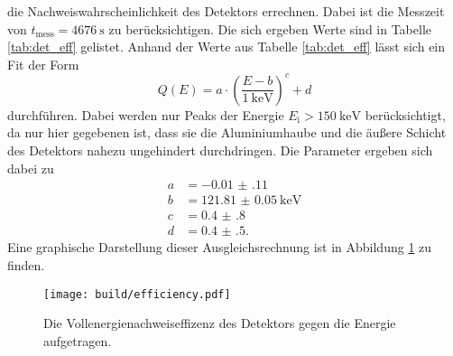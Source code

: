 die Nachweiswahrscheinlichkeit des Detektors errechnen. Dabei ist die Messzeit von $t_\text{mess} = \SI{4676}{\second}$
zu berücksichtigen. Die sich ergeben Werte sind in Tabelle \ref{tab:det_eff} gelistet.
Anhand der Werte aus Tabelle \ref{tab:det_eff} lässt sich ein Fit der Form
\begin{equation}
  Q(E) = a \cdot \left(\frac{E-b}{\SI{1}{\kilo\electronvolt}}\right)^c + d
\end{equation}
durchführen. Dabei werden nur Peaks der Energie $E_\text{i} > \SI{150}{\kilo\electronvolt}$ berücksichtigt,
da nur hier gegebenen ist, dass sie die Aluminiumhaube und die äußere Schicht des Detektors nahezu
ungehindert durchdringen. Die Parameter ergeben sich dabei zu
\begin{align*}
  a &= \num{-0.01(11)} \\
  b &= \SI{121.81(5)}{\kilo\electronvolt} \\
  c &= \num{0.4(8)} \\
  d &= \num{0.4(5)}.
\end{align*}
Eine graphische Darstellung dieser Ausgleichsrechnung ist in Abbildung \ref{fig:effizenz} zu finden.

\begin{figure}[htb]
 \centering
 \texttt{[image: build/efficiency.pdf]}
 \caption{Die Vollenergienachweiseffizenz des Detektors gegen die Energie aufgetragen.}
 \label{fig:effizenz}
\end{figure}

\FloatBarrier


